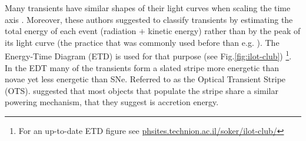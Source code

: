 \documentclass[modern]{aastex62}
\begin{document}
Many transients have similar shapes of their light curves when scaling the time axis \citep{2010ApJ...709L..11K}.
Moreover, these authors suggested to classify transients by estimating the total energy of each event (radiation $+$ kinetic energy) rather than by the peak of its light curve (the practice that was commonly used before than e.g. \citealt{2007Natur.447..458K}).
The Energy-Time Diagram (ETD) is used for that purpose (see Fig.\ref{fig:ilot-club}) \footnote{For an up-to-date ETD figure see \url{phsites.technion.ac.il/soker/ilot-club/} }.
In the EDT many of the transients form a slated stripe more energetic than novae yet less energetic than SNe.
Referred to as the Optical Transient Stripe (OTS).
\cite{2010arXiv1011.1222K} suggested that most objects that populate the stripe share a similar powering mechanism, that they suggest is accretion energy.
\end{document}
